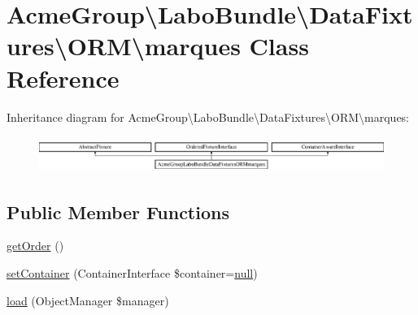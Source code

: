 \hypertarget{class_acme_group_1_1_labo_bundle_1_1_data_fixtures_1_1_o_r_m_1_1marques}{\section{Acme\+Group\textbackslash{}Labo\+Bundle\textbackslash{}Data\+Fixtures\textbackslash{}O\+R\+M\textbackslash{}marques Class Reference}
\label{class_acme_group_1_1_labo_bundle_1_1_data_fixtures_1_1_o_r_m_1_1marques}
}
Inheritance diagram for Acme\+Group\textbackslash{}Labo\+Bundle\textbackslash{}Data\+Fixtures\textbackslash{}O\+R\+M\textbackslash{}marques\+:\begin{figure}[H]
\begin{center}
\leavevmode
\includegraphics[height=1.177708cm]{class_acme_group_1_1_labo_bundle_1_1_data_fixtures_1_1_o_r_m_1_1marques}
\end{center}
\end{figure}
\subsection*{Public Member Functions}
\begin{DoxyCompactItemize}
\item 
\hyperlink{class_acme_group_1_1_labo_bundle_1_1_data_fixtures_1_1_o_r_m_1_1marques_a7fa8716c3add3ddd808fb374185c2eba}{get\+Order} ()
\item 
\hyperlink{class_acme_group_1_1_labo_bundle_1_1_data_fixtures_1_1_o_r_m_1_1marques_ae411d6ec853bf3dbecd66d8ead06949e}{set\+Container} (Container\+Interface \$container=\hyperlink{validate_8js_afb8e110345c45e74478894341ab6b28e}{null})
\item 
\hyperlink{class_acme_group_1_1_labo_bundle_1_1_data_fixtures_1_1_o_r_m_1_1marques_a7860a2f1a28f329197f1a6f5ee3e0277}{load} (Object\+Manager \$manager)
\end{DoxyCompactItemize}


